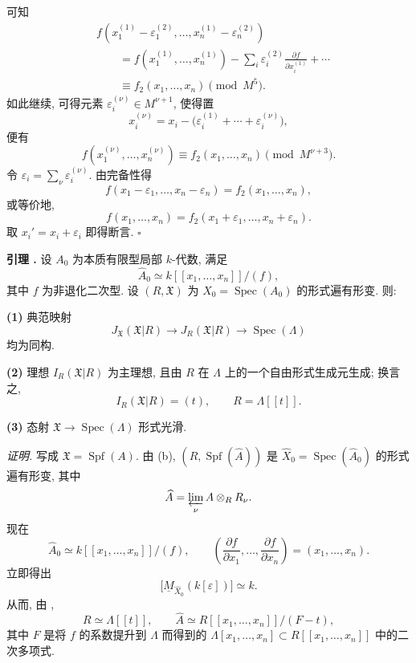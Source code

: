 
可知
\[
\begin{aligned}
&f(x_1^{(1)}-\varepsilon_1^{(2)},\ldots,
  x_n^{(1)}-\varepsilon_n^{(2)})\\
&\qquad =f(x_1^{(1)},\ldots,x_n^{(1)})
 -\sum_i\varepsilon_i^{(2)}
       \frac{\partial f}{\partial x_i^{(1)}}+\cdots\\
&\qquad \equiv f_2(x_1,\ldots,x_n)\pmod{M^5}.
\end{aligned}
\]
如此继续, 可得元素 $\varepsilon_i^{(\nu)}\in M^{\nu+1}$, 使得置
\[
x_i^{(\nu)}
=x_i-\bigl(\varepsilon_i^{(1)}+\cdots+
            \varepsilon_i^{(\nu)}\bigr),
\]
便有
\[
f(x_1^{(\nu)},\ldots,x_n^{(\nu)})
\equiv f_2(x_1,\ldots,x_n)\pmod{M^{\nu+3}}.
\]
令 $\varepsilon_i=\sum_\nu\varepsilon_i^{(\nu)}$. 由完备性得
\[
f(x_1-\varepsilon_1,\ldots,x_n-\varepsilon_n)
=f_2(x_1,\ldots,x_n),
\]
或等价地,
\[
f(x_1,\ldots,x_n)
=f_2(x_1+\varepsilon_1,\ldots,x_n+\varepsilon_n).
\]
取 $x_i'=x_i+\varepsilon_i$ 即得断言.
\hfill$\square$


\par\medskip
\noindent\textbf{引理 .}
设 $A_0$ 为本质有限型局部 $k$-代数, 满足
\[
\widehat A_0\simeq k[[x_1,\ldots,x_n]]/(f),
\]
其中 $f$ 为非退化二次型. 设 $(R,\mathfrak X)$ 为 $X_0=\operatorname{Spec}(A_0)$ 的形式遍有形变. 则:

\smallskip
\noindent\textbf{(1)} 典范映射
\[
J_{\mathfrak X}(\mathfrak X|R)
 \longrightarrow J_R(\mathfrak X|R)
 \longrightarrow \operatorname{Spec}(\Lambda)
\]
均为同构.

\smallskip
\noindent\textbf{(2)} 理想 $I_R(\mathfrak X|R)$ 为主理想, 且由 $R$ 在 $\Lambda$ 上的一个自由形式生成元生成; 换言之,
\[
I_R(\mathfrak X|R)=(t),
\qquad R=\Lambda[[t]].
\]

\smallskip
\noindent\textbf{(3)} 态射 $\mathfrak X\longrightarrow\operatorname{Spec}(\Lambda)$ 形式光滑.

\smallskip
\noindent\textit{证明.}
写成 $\mathfrak X=\operatorname{Spf}(A)$. 由 (b), $(R,\operatorname{Spf}(\widehat A))$ 是 $\widehat X_0=\operatorname{Spec}(\widehat A_0)$ 的形式遍有形变, 其中
\[
\widehat A=\varprojlim_\nu A\otimes_RR_\nu.
\]
现在
\[
\widehat A_0\simeq k[[x_1,\ldots,x_n]]/(f),
\qquad
\left(\frac{\partial f}{\partial x_1},\ldots,
      \frac{\partial f}{\partial x_n}\right)
=(x_1,\ldots,x_n).
\]
立即得出
\[
\bigl[\underline M_{\widehat X_0}(k[\varepsilon])\bigr]
\simeq k.
\]
从而, 由 ,
\[
R\simeq\Lambda[[t]],
\qquad
\widehat A\simeq R[[x_1,\ldots,x_n]]/(F-t),
\]
其中 $F$ 是将 $f$ 的系数提升到 $\Lambda$ 而得到的 $\Lambda[x_1,\ldots,x_n]\subset R[[x_1,\ldots,x_n]]$ 中的二次多项式.

